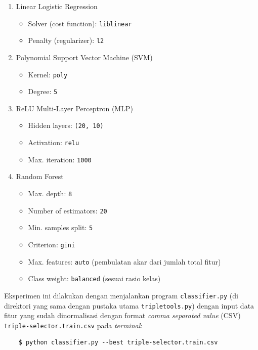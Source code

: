 \begin{enumerate}

	\item Linear Logistic Regression
	\begin{itemize}
		\item Solver (cost function): \verb|liblinear|
		\item Penalty (regularizer): \verb|l2|
	\end{itemize}

	\item Polynomial Support Vector Machine (SVM)
	\begin{itemize}
		\item Kernel: \verb|poly|
		\item Degree: \verb|5|
	\end{itemize}

	\item ReLU Multi-Layer Perceptron (MLP)
	\begin{itemize}
		\item Hidden layers: \verb|(20, 10)|
		\item Activation: \verb|relu| \citep{nair2010rectified}
		\item Max. iteration: \verb|1000|
	\end{itemize}
	
	\item Random Forest
	\begin{itemize}
		\item Max. depth: \verb|8|
		\item Number of estimators: \verb|20|
		\item Min. samples split: \verb|5|
		\item Criterion: \verb|gini| \citep{mingers1989empirical}
		\item Max. features: \verb|auto| (pembulatan akar dari jumlah total fitur)
		\item Class weight: \verb|balanced| (sesuai rasio kelas)
	\end{itemize}

\end{enumerate}

Eksperimen ini dilakukan dengan menjalankan program \verb|classifier.py| (di direktori yang sama dengan pustaka utama \verb|tripletools.py|) dengan input data fitur yang sudah dinormalisasi dengan format \textit{comma separated value} (CSV) \verb|triple-selector.train.csv| pada \textit{terminal}:

\begin{verbatim}
	$ python classifier.py --best triple-selector.train.csv
\end{verbatim}

